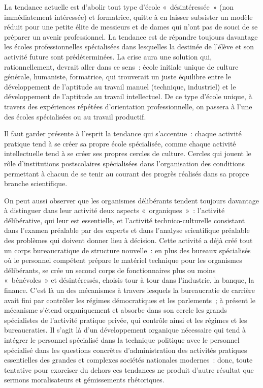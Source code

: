 \documentclass[french,twoside]{book} %
\begin{document}
La tendance actuelle est d’abolir tout type d’école « désintéressée » (non immédiatement intéressée) et formatrice, quitte à en laisser subsister un modèle réduit pour une petite élite de messieurs et de dames qui n’ont pas de souci de se préparer un avenir professionnel. La tendance est de répandre toujours davantage les écoles professionnelles spécialisées dans lesquelles la destinée de l’élève et son activité future sont prédéterminées. La crise aura une solution qui, rationnellement, devrait aller dans ce sens : école initiale unique de culture générale, humaniste, formatrice, qui trouverait un juste équilibre entre le développement de l’aptitude au travail manuel (technique, industriel) et le développement de l’aptitude au travail intellectuel. De ce type d’école unique, à travers des expériences répétées d’orientation professionnelle, on passera à l’une des écoles spécialisées ou au travail productif.\par
Il faut garder présente à l’esprit la tendance qui s’accentue : chaque activité pratique tend à se créer sa propre école spécialisée, comme chaque activité intellectuelle tend à se créer ses propres cercles de culture. Cercles qui jouent le rôle d’institutions postscolaires spécialisées dans l’organisation des conditions permettant à chacun de se tenir au courant des progrès réalisés dans sa propre branche scientifique.\par
On peut aussi observer que les organismes délibérants tendent toujours davantage à distinguer dans leur activité deux aspects « organiques » : l’activité délibérative, qui leur est essentielle, et l’activité technico-culturelle consistant dans l’examen préalable par des experts et dans l’analyse scientifique préalable des problèmes qui doivent donner lieu à décision. Cette activité a déjà créé tout un corps bureaucratique de structure nouvelle : en plus des bureaux spécialisés où le personnel compétent prépare le matériel technique pour les organismes délibérants, se crée un second corps de fonctionnaires plus ou moins « bénévoles » et désintéressés, choisis tour à tour dans l’industrie, la banque, la finance. C'est là un des mécanismes à travers lesquels la bureaucratie de carrière avait fini par contrôler les régimes démocratiques et les parlements ; à présent le mécanisme s’étend organiquement et absorbe dans son cercle les grands spécialistes de l’activité pratique privée, qui contrôle ainsi et les régimes et les bureaucraties. Il s’agit là d’un développement organique nécessaire qui tend à intégrer le personnel spécialisé dans la technique politique avec le personnel spécialisé dans les questions concrètes d’administration des activités pratiques essentielles des grandes et complexes sociétés nationales modernes : donc, toute tentative pour exorciser du dehors ces tendances ne produit d’autre résultat que sermons moralisateurs et gémissements rhétoriques.\par
\end{document}
